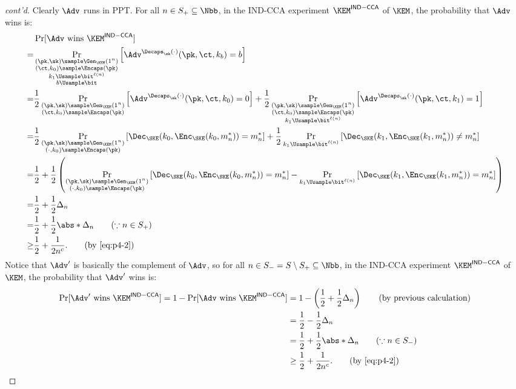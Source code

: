 \begin{answer}
\begin{proof}[cont'd]
        Clearly $\Adv$ runs in PPT. For all $n\in S_+\subseteq\Nbb$, in the IND-CCA experiment $\KEM^{\mathsf{IND-CCA}}$ of $\KEM$, the probability that $\Adv$ wins is:
        \begin{align*}
            &\Pr[\Adv \textrm{ wins } \KEM^{\mathsf{IND-CCA}}]\\
            =& \Pr_{\substack{(\pk, \sk)\sample \Gen_\KEM(1^n)\\(\ct, k_0)\sample\Encaps(\pk)\\k_1\Usample\bit^{\ell(n)}\\b\Usample\bit}}\left[ \Adv^{\Decaps_\sk(\cdot)}(\pk, \ct, k_b) = b \right]\\
            =& \frac{1}{2}\Pr_{\substack{(\pk, \sk)\sample \Gen_\KEM(1^n)\\(\ct, k_0)\sample\Encaps(\pk)}}\left[ \Adv^{\Decaps_\sk(\cdot)}(\pk, \ct, k_0) = 0 \right]
            + \frac{1}{2}\Pr_{\substack{(\pk, \sk)\sample \Gen_\KEM(1^n)\\(\ct, k_0)\sample\Encaps(\pk)\\k_1\Usample\bit^{\ell(n)}}}\left[ \Adv^{\Decaps_\sk(\cdot)}(\pk, \ct, k_1) = 1 \right]\\
            =&  \frac{1}{2}\Pr_{\substack{(\pk, \sk)\sample \Gen_\KEM(1^n)\\(\cdot, k_0)\sample\Encaps(\pk)}}\left[ \Dec_\SKE(k_0, \Enc_\SKE(k_0, m^\ast_n)) =  m^\ast_n \right]
            + \frac{1}{2}\Pr_{\substack{k_1\Usample\bit^{\ell(n)}}}\left[ \Dec_\SKE(k_1, \Enc_\SKE(k_1, m^\ast_n)) \neq   m^\ast_n \right]\\
            =& \frac{1}{2}+\frac{1}{2}\left(\Pr_{\substack{(\pk, \sk)\sample \Gen_\KEM(1^n)\\(\cdot, k_0)\sample\Encaps(\pk)}}\left[ \Dec_\SKE(k_0, \Enc_\SKE(k_0, m^\ast_n)) =  m^\ast_n \right] - \Pr_{k_1\Usample\bit^{\ell(n)}}\left[ \Dec_\SKE(k_1, \Enc_\SKE(k_1, m^\ast_n)) =   m^\ast_n \right]\right)\\
            =& \frac{1}{2}+\frac{1}{2}\Delta_n\\
            =& \frac{1}{2}+\frac{1}{2}\abs*{\Delta_n} \qquad (\because n\in S_+)\\
            \ge&  \frac{1}{2}+\frac{1}{2n^c}. \qquad (\textrm{by \eqref{eq:p4-2}})
        \end{align*}
        Notice that $\Adv'$ is basically the complement of $\Adv$, so for all $n\in S_- = S\setminus S_+\subseteq\Nbb$, in the IND-CCA experiment $\KEM^{\mathsf{IND-CCA}}$ of $\KEM$, the probability that $\Adv'$ wins is:
        \begin{align*}
            \Pr[\Adv' \textrm{ wins } \KEM^{\mathsf{IND-CCA}}]
            = 1- \Pr[\Adv \textrm{ wins } \KEM^{\mathsf{IND-CCA}}]
            &= 1-\left( \frac{1}{2}+\frac{1}{2}\Delta_n\right) \qquad (\textrm{by previous calculation})\\
            &= \frac{1}{2}-\frac{1}{2}\Delta_n\\
            &= \frac{1}{2}+\frac{1}{2}\abs*{\Delta_n} \qquad (\because n\in S_-)\\
            &\ge  \frac{1}{2}+\frac{1}{2n^c}. \qquad (\textrm{by \eqref{eq:p4-2}})
        \end{align*}


\end{proof}
\end{answer}
